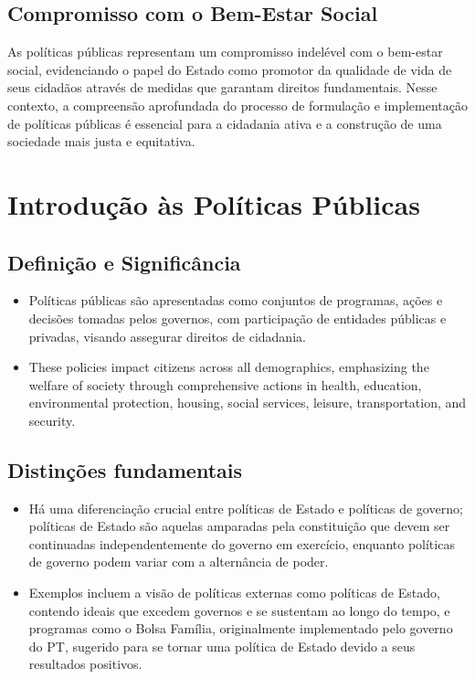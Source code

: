 \documentclass[
   article,       
   12pt,          
   oneside,       
   a4paper,       
   english,       
   brazil,        
   sumario=tradicional
   ]{abntex2}
\begin{document}
\subsection{Compromisso com o Bem-Estar Social}
As políticas públicas representam um compromisso indelével com o bem-estar social, evidenciando o papel do Estado como promotor da qualidade de vida de seus cidadãos através de medidas que garantam direitos fundamentais. Nesse contexto, a compreensão aprofundada do processo de formulação e implementação de políticas públicas é essencial para a cidadania ativa e a construção de uma sociedade mais justa e equitativa.
\section{Introdução às Políticas Públicas}

\subsection{Definição e Significância}
\begin{itemize}
    \item Políticas públicas são apresentadas como conjuntos de programas, ações e decisões tomadas pelos governos, com participação de entidades públicas e privadas, visando assegurar direitos de cidadania.
    \item These policies impact citizens across all demographics, emphasizing the welfare of society through comprehensive actions in health, education, environmental protection, housing, social services, leisure, transportation, and security.
\end{itemize}

\subsection{Distinções fundamentais}
\begin{itemize}
    \item Há uma diferenciação crucial entre políticas de Estado e políticas de governo; políticas de Estado são aquelas amparadas pela constituição que devem ser continuadas independentemente do governo em exercício, enquanto políticas de governo podem variar com a alternância de poder.
    \item Exemplos incluem a visão de políticas externas como políticas de Estado, contendo ideais que excedem governos e se sustentam ao longo do tempo, e programas como o Bolsa Família, originalmente implementado pelo governo do PT, sugerido para se tornar uma política de Estado devido a seus resultados positivos.
\end{itemize}
\end{document}
